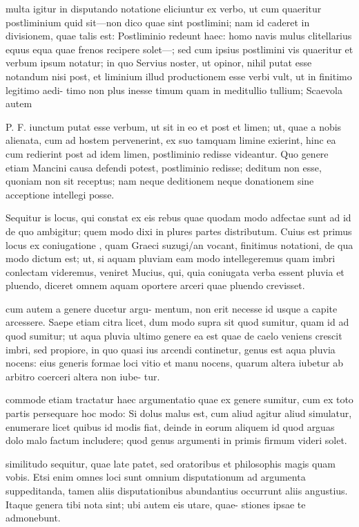  multa igitur in disputando notatione eliciuntur ex verbo, ut cum quaeritur postliminium quid sit—non dico quae sint postlimini; nam id caderet in divisionem, quae talis est: Postliminio redeunt haec: homo navis mulus clitellarius equus equa quae frenos recipere solet—; sed cum ipsius postlimini vis quaeritur et verbum ipsum notatur; in quo Servius noster, ut opinor, nihil putat esse notandum nisi post, et liminium illud productionem esse verbi vult, ut in finitimo legitimo aedi- timo non plus inesse timum quam in meditullio tullium; Scaevola autem

 P. F. iunctum putat esse verbum, ut sit in eo et post et limen; ut, quae a nobis alienata, cum ad hostem pervenerint, ex suo tamquam limine exierint, hinc ea cum redierint post ad idem limen, postliminio redisse videantur. Quo genere etiam Mancini causa defendi potest, postliminio redisse; deditum non esse, quoniam non sit receptus; nam neque deditionem neque donationem sine acceptione intellegi posse.

 Sequitur is locus, qui constat ex eis rebus quae quodam modo adfectae sunt ad id de quo ambigitur; quem modo dixi in plures partes distributum. Cuius est primus locus ex coniugatione , quam Graeci suzugi/an vocant, finitimus notationi, de qua modo dictum est; ut, si aquam pluviam eam modo intellegeremus quam imbri conlectam videremus, veniret Mucius, qui, quia coniugata verba essent pluvia et pluendo, diceret omnem aquam oportere arceri quae pluendo crevisset.

 cum autem a genere ducetur argu- mentum, non erit necesse id usque a capite arcessere. Saepe etiam citra licet, dum modo supra sit quod sumitur, quam id ad quod sumitur; ut aqua pluvia ultimo genere ea est quae de caelo veniens crescit imbri, sed propiore, in quo quasi ius arcendi continetur, genus est aqua pluvia nocens: eius generis formae loci vitio et manu nocens, quarum altera iubetur ab arbitro coerceri altera non iube- tur.

 commode etiam tractatur haec argumentatio quae ex genere sumitur, cum ex toto partis persequare hoc modo: Si dolus malus est, cum aliud agitur aliud simulatur, enumerare licet quibus id modis fiat, deinde in eorum aliquem id quod arguas dolo malo factum includere; quod genus argumenti in primis firmum videri solet.

 similitudo sequitur, quae late patet, sed oratoribus et philosophis magis quam vobis. Etsi enim omnes loci sunt omnium disputationum ad argumenta suppeditanda, tamen aliis disputationibus abundantius occurrunt aliis angustius. Itaque genera tibi nota sint; ubi autem eis utare, quae- stiones ipsae te admonebunt.

